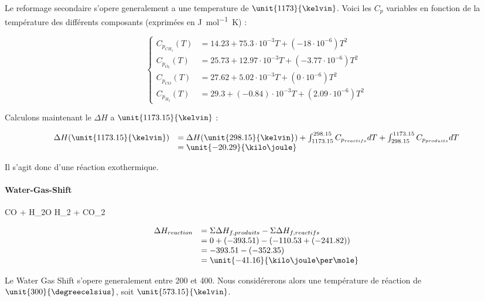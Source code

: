 Le reformage secondaire s'opere generalement a une temperature de $\unit{1173}{\kelvin}$.
Voici les $C_p$ variables en fonction de la température des différents composants \cite{hc-table} 
(exprimées en \unit{\joule\per\mole\kelvin}) :

$$
	\left\{
		\begin{array}{rl}
			C_{p_{CH_4}}(T) 	&= 14.23 + 75.3\cdot10^{-3}T + (-18\cdot10^{-6})T^2 \\
			C_{p_{O_2}}(T) 		&= 25.73 + 12.97\cdot10^{-3}T + (-3.77\cdot10^{-6})T^2 \\
			C_{p_{CO}}(T) 		&= 27.62 + 5.02\cdot10^{-3}T + (0\cdot10^{-6})T^2 \\
			C_{p_{H_2}}(T) 		&= 29.3 + (-0.84)\cdot10^{-3}T + (2.09\cdot10^{-6})T^2
		\end{array}
	\right.
$$

Calculons maintenant le $\Delta H$ a $\unit{1173.15}{\kelvin}$ :

$$
	\begin{array}{rl}
		 	\Delta H(\unit{1173.15}{\kelvin}) &=  \Delta H(\unit{298.15}{\kelvin}) 
																						+ \int_{1173.15}^{298.15} C_{p_{reactifs}} dT + \int_{298.15}^{1173.15} 
																						C_{p_{produits}} dT \\
																				&=  \unit{-20.29}{\kilo\joule}
	\end{array}
$$	

Il s'agit donc d'une réaction exothermique.

\paragraph{Water-Gas-Shift}

\begin{chemmath}
		CO + H_2O \Longrightarrow H_2 + CO_2
\end{chemmath}	

$$
	\begin{array}{rl}
	\Delta H_{reaction}		&= \Sigma \Delta H_{f,produits} - \Sigma \Delta H_{f,reactifs} \\
												&= 0 + (-393.51) - (-110.53 + (-241.82)) \\
												&= -393.51 - (-352.35) \\
												&= \unit{-41.16}{\kilo\joule\per\mole}
	\end{array}
$$

Le Water Gas Shift s'opere generalement entre 200 et \unit{400}{\degreecelsius}. Nous considérerons 
alors une température de réaction de $\unit{300}{\degreecelsius}$, soit $\unit{573.15}{\kelvin}$.
						
